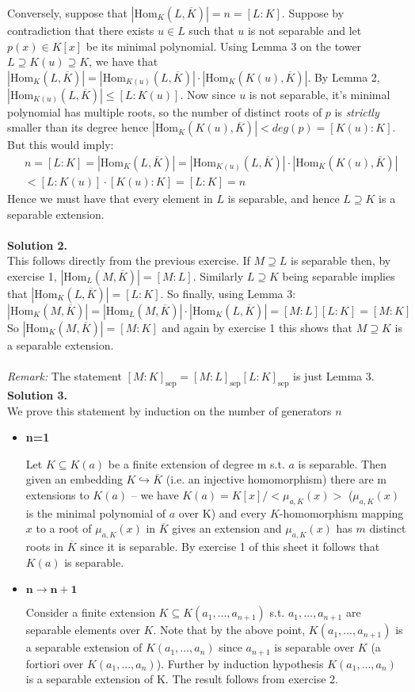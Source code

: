\documentclass[12pt,a4paper]{article}
\newcommand{\Hom}[2]{\text{Hom}_{#1}({#2},\overline{K})}
\begin{document}
Conversely, suppose that $ |\Hom{K}{L}| =n = [L:K]$. Suppose by contradiction that there exists $u\in L$ such that $u$ is not separable and let $p(x)\in K[x]$ be its minimal polynomial.  Using Lemma 3 on the tower $L\supseteq K(u) \supseteq K$, we have that $|\Hom{K}{L}|=|\Hom{K(u)}{L}|\cdot |\Hom{K}{K(u)}|$. By Lemma 2, $|\Hom{K(u)}{L}|\leq[L:K(u)]$. Now since $u$ is not separable, it's minimal polynomial has multiple roots, so the number of distinct roots of $p$ is \textit{strictly} smaller than its degree hence $|\Hom{K}{K(u)}| < \textit{deg}(p) = [K(u):K]$. But this would imply: 
\begin{align*}
&n = [L:K] =  |\Hom{K}{L}|= |\Hom{K(u)}{L}|\cdot |\Hom{K}{K(u)}| \\
&< [L:K(u)]\cdot [K(u):K] = [L:K]=n
\end{align*}
Hence we must have that every element in $L$ is separable, and hence $L\supseteq K$ is a separable extension. \\
\\
\textbf{Solution 2. }\\
This follows directly from the previous exercise. If $M\supseteq L$ is separable then, by exercise 1, $|\Hom{L}{M}|=[M:L]$. Similarly $L\supseteq K$ being separable implies that $|\Hom{K}{L}|=[L:K]$. So finally, using Lemma 3: $$|\Hom{K}{M}|=|\Hom{L}{M}|\cdot |\Hom{K}{L}|= [M:L][L:K] = [M:K]$$
So $|\Hom{K}{M}|=[M:K]$ and again by exercise 1 this shows that $M\supseteq K$ is a separable extension. \\
\\
\textit{Remark:} The statement $[M:K]_{\text{sep}}=[M:L]_{\text{sep}}[L:K]_{\text{sep}}$ is just Lemma 3.
\\

\textbf{Solution 3.  }\\
We prove this statement by induction on the number of generators $n$
\begin{itemize}
    \item \textbf{n=1} 
    
      Let $K\subseteq K(a)$ be a finite extension of degree m s.t. $a$ is separable. Then given an embedding $K\hookrightarrow \overline{K}$ (i.e. an injective homomorphism) there are m extensions to $K(a)$ -- we have $K(a)=K[x]/<\mu_{a,K}(x)>$  ($\mu_{a,K}(x)$ is the minimal polynomial of $a$ over K) and every $K$-homomorphism mapping $x$ to a root of $\mu_{a,K}(x)$ in $\overline{K}$ gives an extension and $\mu_{a,K}(x)$ has $m$ distinct roots in $\overline{K}$ since it is separable. By exercise 1 of this sheet it follows that $K(a)$ is separable.
      
    \item $\mathbf{n\xrightarrow{}n+1}$ 
    
      Consider a finite extension $K\subseteq K(a_1,...,a_{n+1})$ s.t. $a_1,...,a_{n+1}$ are separable elements over $K$. Note that by the above point, $K(a_1,...,a_{n+1})$ is a separable extension of $K(a_1,...,a_n)$ since $a_{n+1}$ is separable over $K$ (a fortiori over $K(a_1,...,a_n)$). Further by induction hypothesis $K(a_1,...,a_n)$ is a separable extension of K. The result follows from exercise 2. 
\end{itemize}{}
\end{document}
